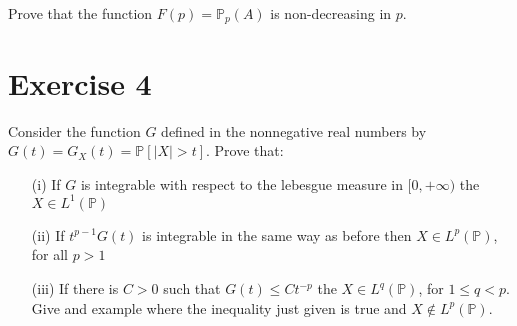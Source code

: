 \documentclass[a4paper,10pt]{article}
\newcommand{\Pro}{\mathbb{P}}
\begin{document}
Prove that the function $F(p)=\Pro_p(A)$ is non-decreasing in $p$.
\hspace{.5cm}

\section*{Exercise 4}

Consider the function $G$ defined in the nonnegative real numbers by $G(t)=G_X(t)=\Pro[|X|>t]$. Prove that:

\begin{enumerate}
 \item[(i)] If $G$ is integrable with respect to the lebesgue measure in $[0,+\infty)$ the $X\in L^1(\Pro)$
 \item[(ii)] If $t^{p-1}G(t)$ is integrable in the same way as before then $X \in L^p(\Pro)$, for all $p>1$
 \item[(iii)] If there is $C> 0$ such that $G(t)\leq Ct^{-p}$ the $X \in L^q(\Pro)$, for $1\leq q < p$. 
 Give and example where the inequality just given is true and $X\notin L^p(\Pro)$.
 
\end{enumerate}
\end{document}
